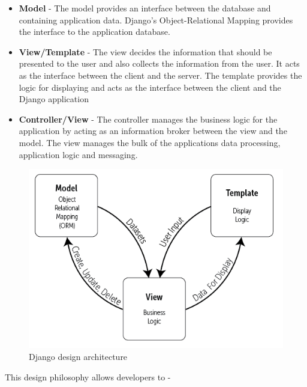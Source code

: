 \documentclass[../thesis.tex]{subfiles}
\begin{document}
\begin{itemize}
	\item \textbf{Model} - The model provides an interface between the database and containing application data. Django’s Object-Relational Mapping provides the interface to the application database.
	\newline
    
	\item \textbf{View/Template} - The view decides the information that should be presented to the user and also collects the information from the user. It acts as the interface between the client and the server. The template provides the logic for displaying and acts as the interface between the client and the Django application
	\newline
    
	\item \textbf{Controller/View} - The controller manages the business logic for the application by acting as an information broker between the view and the model. The view manages the bulk of the applications data processing, application logic and messaging.
	\newline
    
\end{itemize}
\begin{figure}[H]
	\centering
	\includegraphics[width=1\textwidth]{../images/Django.png}
	\caption{Django design architecture}
	\label{rys1}
\end{figure}
This design philosophy allows developers to - 
\end{document}
